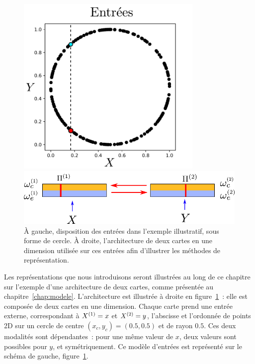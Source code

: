 \documentclass[../main]{subfiles}
\begin{document}
\begin{figure}[t]
    \begin{minipage}{0.4\textwidth}
    \centering
    \includegraphics[width=0.8\textwidth]{2som_inp_noinformation}
    \end{minipage}
    \begin{minipage}{0.6\textwidth}
    \includegraphics[width=\textwidth]{2som_archi}
    \end{minipage}
    \caption{\`A gauche, disposition des entrées dans l'exemple illustratif, sous forme de cercle. \`A droite, l'architecture de deux cartes en une dimension utilisée sur ces entrées afin d'illustrer les méthodes de représentation.\label{fig:exp}}
    \end{figure}

Les représentations que nous introduisons seront illustrées au long de ce chapitre sur l'exemple d'une architecture de deux cartes, comme présentée au chapitre~\ref{chap:modele}.
L'architecture est illustrée à droite en figure~\ref{fig:exp}~: elle est composée de deux cartes en une dimension. Chaque carte prend une entrée externe, correspondant à $X^{({1})}=x$ et $X^{({2})}=y$, l'abscisse et l'ordonnée de points 2D sur un cercle de centre $(x_c,y_c) = (0.5,0.5)$ et de rayon $0.5$.
Ces deux modalités sont dépendantes~: pour une même valeur de $x$, deux valeurs sont possibles pour $y$, et symétriquement. Ce modèle d'entrées est représenté sur le schéma de gauche, figure~\ref{fig:exp}.
\end{document}
